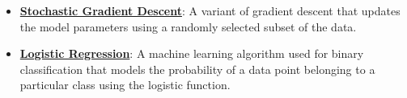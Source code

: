\documentclass{article}%
\begin{document}
\begin{itemize}[leftmargin=*]
\item \href{https://purdue.brightspace.com/d2l/common/assets/pdfjs-d2l-dist/1.0.14-legacy/web/viewer.html?file=%2Fcontent%2Fenforced%2F1095467-wl.202510.CS.24300.001%2F05L2-ML Basics.pdf%3Fou%3D1095467&lang=en-us&container=d2l-fileviewer-rendered-pdf&fullscreen=d2l-fileviewer-rendered-pdf-dialog&height=667#page=29}{\textbf{Stochastic Gradient Descent}}: A variant of gradient descent that updates the model parameters using a randomly selected subset of the data.%
\item \href{https://purdue.brightspace.com/d2l/common/assets/pdfjs-d2l-dist/1.0.14-legacy/web/viewer.html?file=%2Fcontent%2Fenforced%2F1095467-wl.202510.CS.24300.001%2F05L2-ML Basics.pdf%3Fou%3D1095467&lang=en-us&container=d2l-fileviewer-rendered-pdf&fullscreen=d2l-fileviewer-rendered-pdf-dialog&height=667#page=31}{\textbf{Logistic Regression}}: A machine learning algorithm used for binary classification that models the probability of a data point belonging to a particular class using the logistic function.%
\end{itemize}

%
\end{document}
